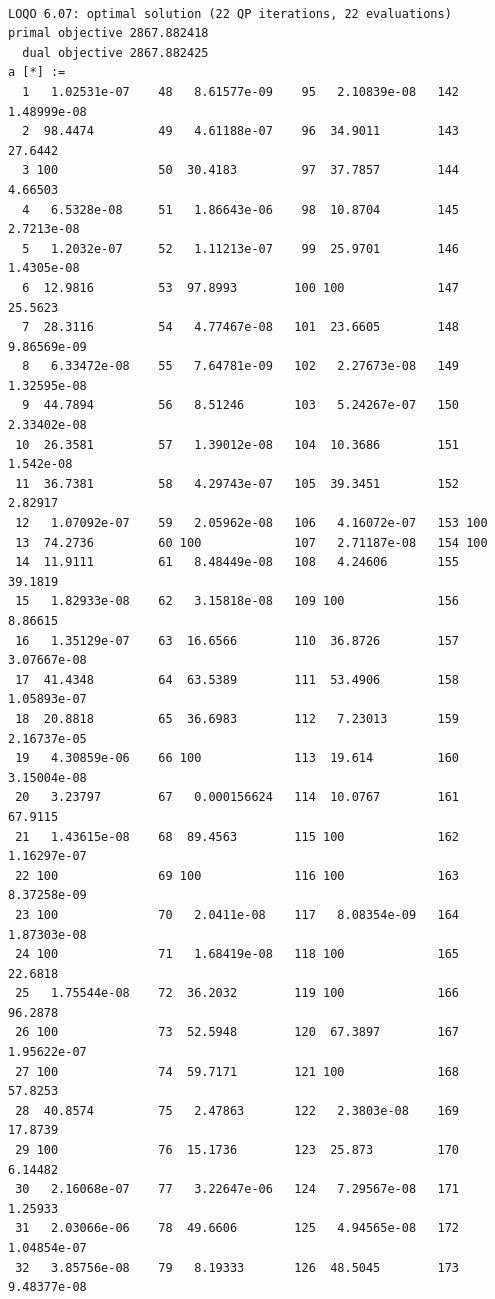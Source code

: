 \documentclass{article}
\begin{document}
\begin{verbatim}

LOQO 6.07: optimal solution (22 QP iterations, 22 evaluations)
primal objective 2867.882418
  dual objective 2867.882425
a [*] :=
  1   1.02531e-07    48   8.61577e-09    95   2.10839e-08   142   1.48999e-08
  2  98.4474         49   4.61188e-07    96  34.9011        143  27.6442
  3 100              50  30.4183         97  37.7857        144   4.66503
  4   6.5328e-08     51   1.86643e-06    98  10.8704        145   2.7213e-08
  5   1.2032e-07     52   1.11213e-07    99  25.9701        146   1.4305e-08
  6  12.9816         53  97.8993        100 100             147  25.5623
  7  28.3116         54   4.77467e-08   101  23.6605        148   9.86569e-09
  8   6.33472e-08    55   7.64781e-09   102   2.27673e-08   149   1.32595e-08
  9  44.7894         56   8.51246       103   5.24267e-07   150   2.33402e-08
 10  26.3581         57   1.39012e-08   104  10.3686        151   1.542e-08
 11  36.7381         58   4.29743e-07   105  39.3451        152   2.82917
 12   1.07092e-07    59   2.05962e-08   106   4.16072e-07   153 100
 13  74.2736         60 100             107   2.71187e-08   154 100
 14  11.9111         61   8.48449e-08   108   4.24606       155  39.1819
 15   1.82933e-08    62   3.15818e-08   109 100             156   8.86615
 16   1.35129e-07    63  16.6566        110  36.8726        157   3.07667e-08
 17  41.4348         64  63.5389        111  53.4906        158   1.05893e-07
 18  20.8818         65  36.6983        112   7.23013       159   2.16737e-05
 19   4.30859e-06    66 100             113  19.614         160   3.15004e-08
 20   3.23797        67   0.000156624   114  10.0767        161  67.9115
 21   1.43615e-08    68  89.4563        115 100             162   1.16297e-07
 22 100              69 100             116 100             163   8.37258e-09
 23 100              70   2.0411e-08    117   8.08354e-09   164   1.87303e-08
 24 100              71   1.68419e-08   118 100             165  22.6818
 25   1.75544e-08    72  36.2032        119 100             166  96.2878
 26 100              73  52.5948        120  67.3897        167   1.95622e-07
 27 100              74  59.7171        121 100             168  57.8253
 28  40.8574         75   2.47863       122   2.3803e-08    169  17.8739
 29 100              76  15.1736        123  25.873         170   6.14482
 30   2.16068e-07    77   3.22647e-06   124   7.29567e-08   171   1.25933
 31   2.03066e-06    78  49.6606        125   4.94565e-08   172   1.04854e-07
 32   3.85756e-08    79   8.19333       126  48.5045        173   9.48377e-08

\end{verbatim}
\end{document}
